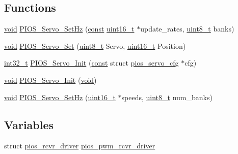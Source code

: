 \subsection*{Functions}
\begin{DoxyCompactItemize}
\item 
\hyperlink{group___n_a_m_e_ga18028b8badbf1ea7e704ccac3c488e82}{void} \hyperlink{group___p_i_o_s___s_e_r_v_o_gacc20fb520926dba9214e34206d9c6e88}{P\-I\-O\-S\-\_\-\-Servo\-\_\-\-Set\-Hz} (\hyperlink{group___n_a_m_e_ga7ae6d0e43244213b34de2c2b9aa30da6}{const} \hyperlink{stdint_8h_a273cf69d639a59973b6019625df33e30}{uint16\-\_\-t} $\ast$update\-\_\-rates, \hyperlink{stdint_8h_aba7bc1797add20fe3efdf37ced1182c5}{uint8\-\_\-t} banks)
\item 
\hyperlink{group___n_a_m_e_ga18028b8badbf1ea7e704ccac3c488e82}{void} \hyperlink{group___p_i_o_s___s_e_r_v_o_ga9191a380c1c605a4cab312e5d850b58f}{P\-I\-O\-S\-\_\-\-Servo\-\_\-\-Set} (\hyperlink{stdint_8h_aba7bc1797add20fe3efdf37ced1182c5}{uint8\-\_\-t} Servo, \hyperlink{stdint_8h_a273cf69d639a59973b6019625df33e30}{uint16\-\_\-t} Position)
\item 
\hyperlink{group___n_a_m_e_gafd12020da5a235dfcf0c3c748fb5baed}{int32\-\_\-t} \hyperlink{group___p_i_o_s___s_e_r_v_o_ga9d74027bc92b7db6f1b0dc049ba1625d}{P\-I\-O\-S\-\_\-\-Servo\-\_\-\-Init} (\hyperlink{group___n_a_m_e_ga7ae6d0e43244213b34de2c2b9aa30da6}{const} struct \hyperlink{structpios__servo__cfg}{pios\-\_\-servo\-\_\-cfg} $\ast$cfg)
\item 
\hyperlink{group___n_a_m_e_ga18028b8badbf1ea7e704ccac3c488e82}{void} \hyperlink{group___p_i_o_s___s_e_r_v_o_gabafbef92dbd77f2471fafe2a32281f87}{P\-I\-O\-S\-\_\-\-Servo\-\_\-\-Init} (\hyperlink{group___n_a_m_e_ga18028b8badbf1ea7e704ccac3c488e82}{void})
\item 
\hyperlink{group___n_a_m_e_ga18028b8badbf1ea7e704ccac3c488e82}{void} \hyperlink{group___p_i_o_s___s_e_r_v_o_ga802324890fb1c0428cd7d1d4e263ab1b}{P\-I\-O\-S\-\_\-\-Servo\-\_\-\-Set\-Hz} (\hyperlink{stdint_8h_a273cf69d639a59973b6019625df33e30}{uint16\-\_\-t} $\ast$speeds, \hyperlink{stdint_8h_aba7bc1797add20fe3efdf37ced1182c5}{uint8\-\_\-t} num\-\_\-banks)
\end{DoxyCompactItemize}
\subsection*{Variables}
\begin{DoxyCompactItemize}
\item 
struct \hyperlink{structpios__rcvr__driver}{pios\-\_\-rcvr\-\_\-driver} \hyperlink{group___p_i_o_s___s_e_r_v_o_ga767a19a3a54afa71399b7467963690df}{pios\-\_\-pwm\-\_\-rcvr\-\_\-driver}
\end{DoxyCompactItemize}


